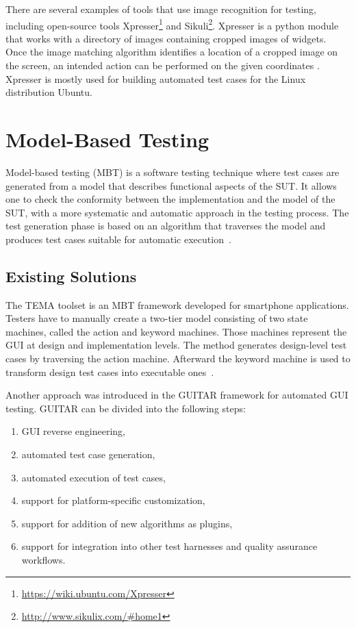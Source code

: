 There are several examples of tools that use image recognition for testing, including open-source tools Xpresser\footnote{\url{https://wiki.ubuntu.com/Xpresser}} and Sikuli\footnote{\url{http://www.sikulix.com/\#home1}}. Xpresser is a python module that works with a directory of images containing cropped images of widgets. Once the image matching algorithm identifies a location of a cropped image on the screen, an intended action can be performed on the given coordinates \cite{xpresser}. Xpresser is mostly used for building automated test cases for the Linux distribution Ubuntu.

\section{Model-Based Testing}
Model-based testing (MBT) is a software testing technique where test cases are generated from a model that describes functional aspects of the SUT. It allows one to check the conformity between the implementation and the model of the SUT, with a more systematic and automatic approach in the testing process. The test generation phase is based on an algorithm that traverses the model and produces test cases suitable for automatic execution~\cite{embedded}.

\subsection{Existing Solutions}\label{TEMA_TOOLSET}
The TEMA toolset is an MBT framework developed for smartphone applications. Testers have to manually create a two-tier model consisting of two state machines, called the action and keyword machines. Those machines represent the GUI at design and implementation levels. The method generates design-level test cases by traversing the action machine. Afterward the keyword machine is used to transform design test cases into executable ones~\cite{TEMA}.

Another approach was introduced in the GUITAR \cite{NguyenBao2014Gait} framework for automated GUI testing. GUITAR can be divided into the following steps:
\begin{enumerate}
    \item GUI reverse engineering,
    \item automated test case generation,
    \item automated execution of test cases,
    \item support for platform-specific customization,
    \item support for addition of new algorithms as plugins,
    \item support for integration into other test harnesses and quality assurance workflows.
\end{enumerate}

